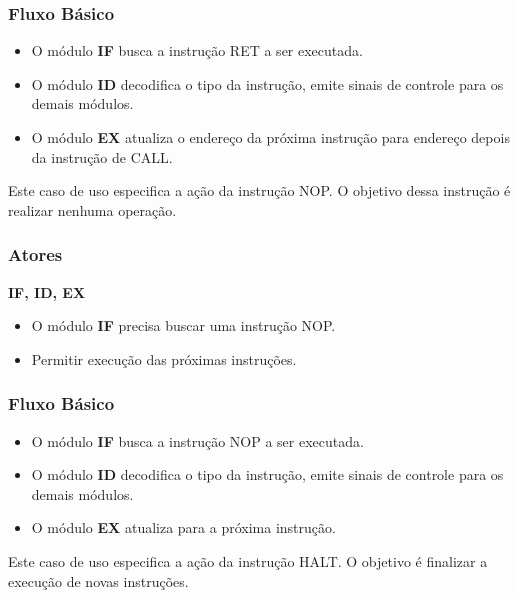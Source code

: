 \subsubsection*{Fluxo Básico}
\begin{itemize}
	\item O módulo \textbf{IF} busca a instrução RET a ser executada.
	\item O módulo \textbf{ID} decodifica o tipo da instrução, emite sinais de controle para os demais módulos.
	\item O módulo \textbf{EX} atualiza o endereço da próxima instrução para endereço depois da instrução de CALL.
\end{itemize}


Este caso de uso especifica a ação da instrução NOP. O objetivo dessa instrução é realizar nenhuma operação.

\subsubsection*{Atores}
\textbf{IF, ID, EX}

\preconditions 
\begin{itemize}
	\item O módulo \textbf{IF} precisa buscar uma instrução NOP.
\end{itemize}

\postconditions
\begin{itemize}	
	\item Permitir execução das próximas instruções.
\end{itemize}

\subsubsection*{Fluxo Básico}
\begin{itemize}
	\item O módulo \textbf{IF} busca a instrução NOP a ser executada.
	\item O módulo \textbf{ID} decodifica o tipo da instrução, emite sinais de controle para os demais módulos.
	\item O módulo \textbf{EX} atualiza para a próxima instrução.
\end{itemize}


Este caso de uso especifica a ação da instrução HALT. O objetivo é finalizar a execução de novas instruções.

